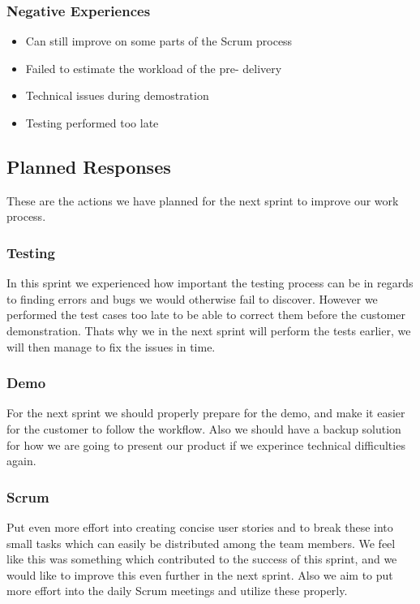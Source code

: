 \subsubsection{Negative Experiences}
\begin{itemize}
\item Can still improve on some parts of the Scrum process
\item Failed to estimate the workload of the pre- delivery
\item Technical issues during demostration
\item Testing performed too late
\end{itemize}

\subsection{Planned Responses}
These are the actions we have planned for the next sprint to improve our work process.

\subsubsection{Testing}
In this sprint we experienced how important the testing process can be in regards to finding errors and bugs we would otherwise fail to discover. However we performed the test cases too late to be able to correct them before the customer demonstration. Thats why we in the next sprint will perform the tests earlier, we will then manage to fix the issues in time.

\subsubsection{Demo}
For the next sprint we should properly prepare for the demo, and make it easier for the customer to follow the workflow. Also we should have a backup solution for how we are going to present our product if we experince technical difficulties again.

\subsubsection{Scrum}
Put even more effort into creating concise user stories and to break these into small tasks which can easily be distributed among the team members. We feel like this was something which contributed to the success of this sprint, and we would like to improve this even further in the next sprint. Also we aim to put more effort into the daily Scrum meetings and utilize these properly.